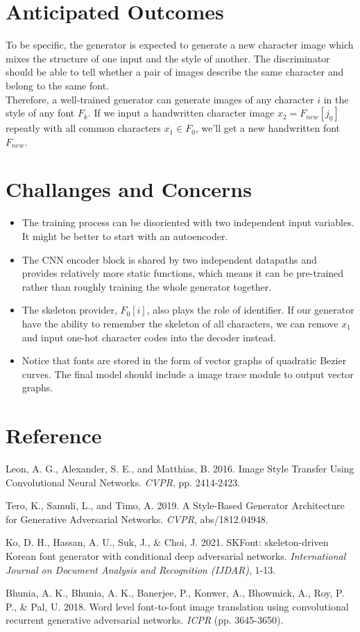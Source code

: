 \documentclass[letterpaper]{article}
\begin{document}
\section{Anticipated Outcomes}
To be specific, the generator is expected to generate a new character image which mixes the structure of one input and the style of another. The discriminator should be able to tell whether a pair of images describe the same character and belong to the same font.
\\
Therefore, a well-trained generator can generate images of any character $i$ in the style of any font $F_k$. If we input a handwritten character image $x_2=F_{new}[j_0]$ repeatly with all common characters $x_1\in F_0$, we'll get a new handwritten font $F_{new}$.

\section{Challanges and Concerns}
\begin{itemize}
    \item The training process can be disoriented with two independent input variables. It might be better to start with an autoencoder.
    \item The CNN encoder block is shared by two independent datapaths and provides relatively more static functions, which means it can be pre-trained rather than roughly training the whole generator together.
    \item The skeleton provider, $F_0[i]$, also plays the role of identifier. If our generator have the ability to remember the skeleton of all characters, we can remove $x_1$ and input one-hot character codes into the decoder instead.
    \item Notice that fonts are stored in the form of vector graphs of quadratic Bezier curves. The final model should include a image trace module to output vector graphs.
\end{itemize}

\section{Reference}
\smallskip \noindent
Leon, A. G., Alexander, S. E., and Matthias, B. 2016. Image Style Transfer Using Convolutional Neural Networks. \textit{CVPR}, pp. 2414-2423.

\smallskip \noindent
Tero, K., Samuli, L., and Timo, A. 2019. A Style-Based Generator Architecture for Generative Adversarial Networks. \textit{CVPR}, abs/1812.04948.

\smallskip \noindent
Ko, D. H., Hassan, A. U., Suk, J., \& Choi, J. 2021. SKFont: skeleton-driven Korean font generator with conditional deep adversarial networks. \textit{International Journal on Document Analysis and Recognition (IJDAR)}, 1-13.

\smallskip \noindent
Bhunia, A. K., Bhunia, A. K., Banerjee, P., Konwer, A., Bhowmick, A., Roy, P. P., \& Pal, U. 2018. Word level font-to-font image translation using convolutional recurrent generative adversarial networks. \textit{ICPR} (pp. 3645-3650).





\end{document}
